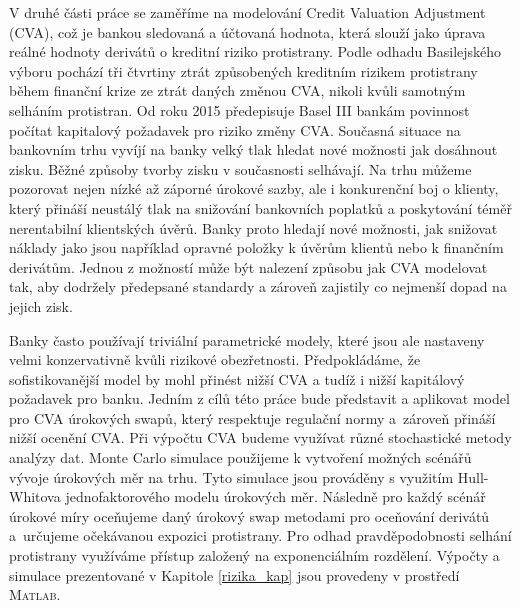 \documentclass[a4paper,12pt]{report}
\theoremstyle{definition} \newtheorem{definice}[veta]{Definice}
\theoremstyle{remark}
\newcommand{\MATLAB}{\textsc{Matlab}\xspace}
\begin{document}
V druhé části práce se zaměříme na modelování Credit Valuation Adjustment (CVA), což je bankou sledovaná a účtovaná hodnota, která slouží jako úprava reálné hodnoty derivátů o kreditní riziko protistrany.
Podle odhadu Basilejského výboru pochází tři čtvrtiny ztrát způsobených kreditním rizikem protistrany během finanční krize ze ztrát daných změnou CVA, nikoli kvůli samotným selháním protistran. 
Od roku 2015 předepisuje Basel III bankám povinnost počítat kapitalový požadavek pro riziko změny CVA.
Současná situace na bankovním trhu vyvíjí na banky velký tlak hledat nové možnosti jak dosáhnout zisku.
Běžné způsoby tvorby zisku v současnosti selhávají.
Na trhu můžeme pozorovat nejen nízké až záporné úrokové sazby, ale i konkurenční boj o klienty, který přináší neustálý tlak na snižování bankovních poplatků a poskytování téměř nerentabilní klientských úvěrů.
Banky proto hledají nové možnosti, jak snižovat náklady jako jsou například opravné položky k úvěrům klientů nebo k finančním derivátům.
Jednou z možností může být nalezení způsobu jak CVA modelovat tak, aby dodržely předepsané standardy a zároveň zajistily co nejmenší dopad na jejich zisk. 

Banky často používají triviální parametrické modely, které jsou ale nastaveny velmi konzervativně kvůli rizikové obezřetnosti.
Předpokládáme, že sofistikovanější model by mohl přinést nižší CVA a tudíž i nižší kapitálový požadavek pro banku. 
Jedním z cílů této práce bude představit a aplikovat model pro CVA úrokových swapů, který respektuje regulační normy a~zároveň přináší nižší ocenění CVA.
Při výpočtu CVA budeme využívat různé stochastické metody analýzy dat.
Monte Carlo simulace použijeme k vytvoření  možných scénářů vývoje úrokových měr na trhu. 
Tyto simulace jsou prováděny s využitím Hull-Whitova jednofaktorového modelu úrokových měr.
Následně pro každý scénář úrokové míry oceňujeme daný úrokový swap metodami pro oceňování derivátů a~určujeme očekávanou expozici protistrany.
Pro odhad pravděpodobnosti selhání protistrany využíváme přístup založený na exponenciálním rozdělení.
Výpočty a simulace prezentované v Kapitole \ref{rizika_kap} jsou provedeny v prostředí \MATLAB.
\end{document}
